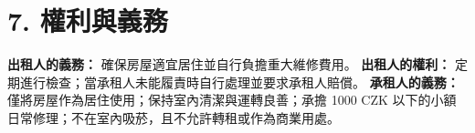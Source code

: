\section*{7. 權利與義務}
\textbf{出租人的義務：} 確保房屋適宜居住並自行負擔重大維修費用。
\textbf{出租人的權利：} 定期進行檢查；當承租人未能履責時自行處理並要求承租人賠償。
\textbf{承租人的義務：} 僅將房屋作為居住使用；保持室內清潔與運轉良善；承擔 1000 CZK 以下的小額日常修理；不在室內吸菸，且不允許轉租或作為商業用處。
